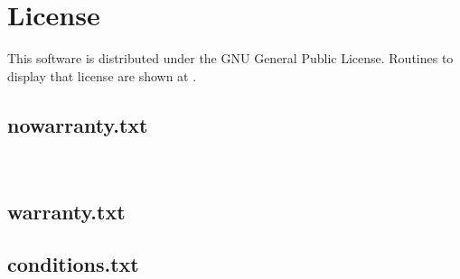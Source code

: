 \section{License}\label{sec:license}

This software is distributed under the  GNU General Public License.
Routines to display that license are shown at .

\subsection{nowarranty.txt}\label{sec:nowar}
{\scriptsize \ME~

}

\subsection{warranty.txt}\label{sec:war}
{\scriptsize

}

\subsection{conditions.txt}\label{sec:cond}
{\scriptsize

}



